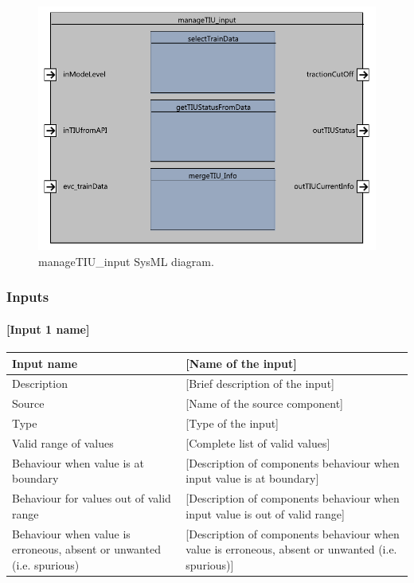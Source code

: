 \begin{figure}
\center
\includegraphics[width=.7\textwidth]{images/F2_12_manageTIU_input.pdf}
\caption{manageTIU\_input SysML diagram.}\label{f:manageTIUInput}
\end{figure}


\subsubsection{Inputs}\label{s:manageTIUInput_inputs}

\paragraph{[Input 1 name]}

\begin{longtable}{p{}p{}}
\toprule
Input name				& [Name of the input] \\
\midrule
Description				& [Brief description of the input] \\
\midrule
Source					& [Name of the source component] \\ 
\midrule
Type					& [Type of the input] \\
\midrule
Valid range of values	& [Complete list of valid values] \\
\midrule
Behaviour when value is at boundary	& [Description of components behaviour when input value is at boundary] \\
\midrule
Behaviour for values out of valid range	& [Description of components behaviour when input value is out of valid range] \\
\midrule
Behaviour when value is erroneous, absent or unwanted (i.e. spurious) & [Description of components behaviour when value is erroneous, absent or unwanted (i.e. spurious)] \\
\bottomrule
\end{longtable}


